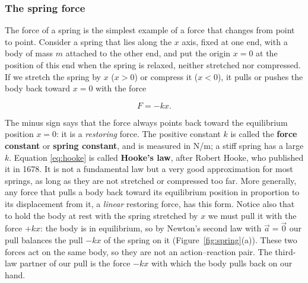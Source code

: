 \documentclass[11pt,a4paper]{article}
\begin{document}
\subsubsection*{The spring force}

The force of a spring is the simplest example of a force that changes from point to point. Consider
a spring that lies along the $x$ axis, fixed at one end, with a body of mass $m$ attached to the other
end, and put the origin $x = 0$ at the position of this end when the spring is relaxed, neither
stretched nor compressed. If we stretch the spring by $x$ ($x > 0$) or compress it ($x < 0$), it pulls
or pushes the body back toward $x = 0$ with the force
\begin{keyresult}
\begin{equation}\label{eq:hooke}
  F = -kx .
\end{equation}
\end{keyresult}
The minus sign says that the force always points back toward the equilibrium position $x = 0$: it is
a \emph{restoring} force. The positive constant $k$ is called the \textbf{force constant} or
\textbf{spring constant}, and is measured in \unit{N/m}; a stiff spring has a large $k$. Equation
\eqref{eq:hooke} is called \textbf{Hooke's law}, after Robert Hooke, who published it in 1678. It is
not a fundamental law but a very good approximation for most springs, as long as they are not
stretched or compressed too far. More generally, any force that pulls a body back toward its
equilibrium position in proportion to its displacement from it, a \emph{linear} restoring force, has
this form. Notice also that to hold the body at rest with the spring stretched by $x$ we must pull it
with the force $+kx$: the body is in equilibrium, so by Newton's second law with $\vec{a} = \vec{0}$
our pull balances the pull $-kx$ of the spring on it (Figure~\ref{fig:spring}(a)). These two forces
act on the same body, so they are not an action--reaction pair. The third-law partner of our pull is
the force $-kx$ with which the body pulls back on our hand.
\end{document}
